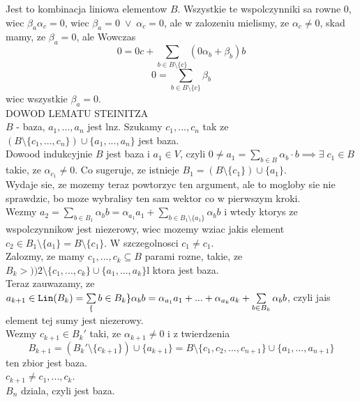 \documentclass{article}
\begin{document}
Jest to kombinacja liniowa elementow $B$. Wszystkie te wspolczynniki sa rowne 0, wiec $\beta_a\alpha_c=0$, wiec $\beta_a=0\;\lor\;\alpha_c=0$, ale w zalozeniu mielismy, ze $\alpha_c\neq 0$, skad mamy, ze $\beta_a=0$, ale Wowczas
$$0=0c+\sum\limits_{b\in B\setminus\{c\}}(0\alpha_b+\beta_b)b$$
$$0=\sum\limits_{b\in B\setminus\{c\}}\beta_b$$
wiec wszystkie $\beta_a=0$.\\
DOWOD LEMATU STEINITZA\\
$B$ - baza, $a_1, ..., a_n$ jest lnz. Szukamy $c_1, ..., c_n$ tak ze $(B\setminus\{c_1, ..., c_n\})\cup\{a_1, ..., a_n\}$ jest baza.\\
Dowood indukcyjnie
$B$ jest baza i $a_1\in V$, czyli $0\neq a_1=\sum\limits_{b\in B}\alpha_b\cdot b\implies \exists\;c_1\in B$ takie, ze $\alpha_{c_1}\neq0$. Co sugeruje, ze istnieje $B_1 = (B\setminus\{c_1\})\cup\{a_1\}$.\\
Wydaje sie, ze mozemy teraz powtorzyc ten argument, ale to mogloby sie nie sprawdzic, bo moze wybralisy ten sam wektor co w pierwszym kroki.\\
Wezmy $a_2=\sum\limits_{b\in B_1}\alpha_bb=\alpha_{a_1}a_1+\sum\limits_{b\in B_1\setminus\{a_1\}}\alpha_bb$ i wtedy ktorys ze wspolczynnikow jest niezerowy, wiec mozemy wziac jakis element $c_2\in B_1\setminus\{a_1\}=B\setminus\{c_1\}$. W szczegolnosci $c_1\neq c_1$.\\
Zalozmy, ze mamy $c_1, ..., c_k\subseteq B$ parami rozne, takie, ze $B_k>))2\setminus\{c_1, ..., c_k\}\cup\{a_1, ..., a_k\}$l ktora jest baza.\\
Teraz zauwazamy, ze $a_{k+1}\in\texttt{Lin}(B_k)=\sum\limits_\{b\in B_k\}\alpha_bb=\alpha_{a_1}a_1+...+\alpha_{a_k}a_k+\sum\limits_{b\in B_k}\alpha_bb$, czyli jais element tej sumy jest niezerowy.\\
Wezmy $c_{k+1}\in B_k'$ taki, ze $\alpha_{k+1}\neq0$ i z twierdzenia
$$B_{k+1}=(B_k'\setminus \{c_{k+1}\})\cup\{a_{k+1}\}=B\setminus\{c_1, c_2, ..., c_{n+1}\}\cup\{a_1, ..., a_{n+1}\}$$
ten zbior jest baza.\\
$c_{k+1}\neq c_1, ..., c_k$.\\
$B_n$ dziala, czyli jest baza.
\end{document}
